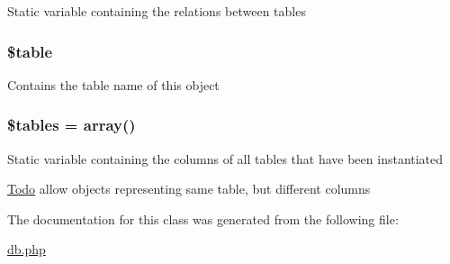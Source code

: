 \label{classtable_a5787b67dccb801e89f4ff779d42edece}
Static variable containing the relations between tables \hypertarget{classtable_ae8876a14058f368335baccf35af4a22b}{
\subsubsection[{\$table}]{\setlength{\rightskip}{0pt plus 5cm}\${\bf table}}}
\label{classtable_ae8876a14058f368335baccf35af4a22b}
Contains the table name of this object \hypertarget{classtable_a3d332a3c374a53802495dcb045f6133f}{
\subsubsection[{\$tables}]{\setlength{\rightskip}{0pt plus 5cm}\$tables = array()}}
\label{classtable_a3d332a3c374a53802495dcb045f6133f}
Static variable containing the columns of all tables that have been instantiated \begin{Desc}
\item[\hyperlink{todo__todo000004}{Todo}]allow objects representing same table, but different columns \end{Desc}


The documentation for this class was generated from the following file:\begin{DoxyCompactItemize}
\item 
\hyperlink{db_8php}{db.php}\end{DoxyCompactItemize}
